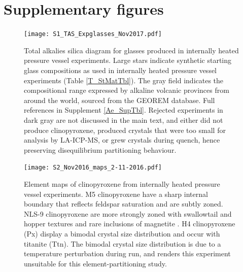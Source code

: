 \documentclass[review,authoryear,12pt]{elsarticle}
\begin{document}
\section{Supplementary figures}
% 
\begin{figure}[htpb]
\begin{center}
\texttt{[image: S1\_TAS\_Expglasses\_Nov2017.pdf]}
\caption[Total alkalies silica diagram for glasses produced in internally heated pressure vessel experiments]{Total alkalies silica diagram for glasses produced in internally heated pressure vessel experiments. Large stars indicate synthetic starting glass compositions as used in internally heated pressure vessel experiments (Table \ref{T_StMatTbl}). The gray field indicates the compositional range expressed by alkaline volcanic provinces from around the world, sourced from the GEOREM database. Full references in Supplement \ref{Ae_SupTbl}. Rejected experiments in dark gray are not discussed in the main text, and either did not produce clinopyroxene, produced crystals that were too small for analysis by LA-ICP-MS, or grew crystals during quench, hence preserving disequilibrium partitioning behaviour.}
\label{TAS}
\end{center}
\end{figure}



\begin{figure}
\begin{center}
\texttt{[image: S2\_Nov2016\_maps\_2-11-2016.pdf]}
\caption[Element maps of clinopyroxene from internally heated pressure vessel experiments]{Element maps of clinopyroxene from internally heated pressure vessel experiments. M5 clinopyroxene have a sharp internal boundary that reflects feldspar saturation and are subtly zoned. NLS-9 clinopyroxene are more strongly zoned with swallowtail and hopper textures and rare inclusions of magnetite \citep[cf.][]{Walker1976, Lofgren1989,Shea2013}. H4 clinopyroxene (Px) display a bimodal crystal size distribution and occur with titanite (Ttn). The bimodal crystal size distribution is due to a temperature perturbation during run, and renders this experiment unsuitable for this element-partitioning study.}
\label{ElementMap_Supplement}
\end{center}
\end{figure}
\end{document}

